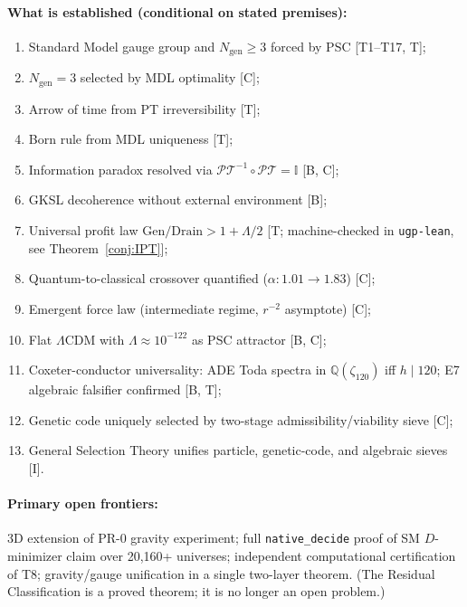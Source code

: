 \documentclass[11pt]{article}
\newcommand{\PT}{\mathcal{P}\mathcal{T}}
\theoremstyle{plain}
\theoremstyle{definition}
\theoremstyle{remark}
\begin{document}
\paragraph{What is established (conditional on stated premises):}
\begin{enumerate}[nosep]
\item Standard Model gauge group and $N_\mathrm{gen} \ge 3$ forced by PSC [T1--T17, T];
\item $N_\mathrm{gen} = 3$ selected by MDL optimality [C];
\item Arrow of time from PT irreversibility [T];
\item Born rule from MDL uniqueness [T];
\item Information paradox resolved via $\PT^{-1}\circ\PT = \mathbb{I}$ [B, C];
\item GKSL decoherence without external environment [B];
\item Universal profit law $\mathrm{Gen/Drain} > 1 + \Lambda/2$ [T; machine-checked in \texttt{ugp-lean}, see Theorem~\ref{conj:IPT}];
\item Quantum-to-classical crossover quantified ($\alpha: 1.01 \to 1.83$) [C];
\item Emergent force law (intermediate regime, $r^{-2}$ asymptote) [C];
\item Flat $\Lambda$CDM with $\Lambda \approx 10^{-122}$ as PSC attractor [B, C];
\item Coxeter-conductor universality: ADE Toda spectra in $\mathbb{Q}(\zeta_{120})$ iff $h \mid 120$;
  E7 algebraic falsifier confirmed [B, T];
\item Genetic code uniquely selected by two-stage admissibility/viability sieve [C];
\item General Selection Theory unifies particle, genetic-code, and algebraic sieves [I].
\end{enumerate}

\paragraph{Primary open frontiers:}
3D extension of PR-0 gravity experiment;
full \texttt{native\_decide} proof of SM $D$-minimizer claim over 20,160+ universes;
independent computational certification of T8;
gravity/gauge unification in a single two-layer theorem.
(The Residual Classification is a proved theorem; it is no longer an open problem.)

\appendix
\end{document}
